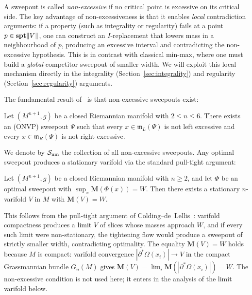 A sweepout is called \emph{non-excessive} if no critical point is excessive on its critical side. The key advantage of non-excessiveness is that it enables \emph{local} contradiction arguments: if a property (such as integrality or regularity) fails at a point $p \in \mathbf{spt}\|V\|$, one can construct an $I$-replacement that lowers mass in a neighbourhood of $p$, producing an excessive interval and contradicting the non-excessive hypothesis. This is in contrast with classical min-max, where one must build a \emph{global} competitor sweepout of smaller width. We will exploit this local mechanism directly in the integrality (Section~\ref{sec:integrality}) and regularity (Section~\ref{sec:regularity}) arguments.

The fundamental result of~\cite{CLS22} is that non-excessive sweepouts exist:

\begin{theorem}\label{thm:non-excessive-existence}
Let $(M^{n+1},g)$ be a closed Riemannian manifold with $2\leq n\leq 6$. There exists an (ONVP) sweepout $\Psi$ such that every $x\in \mathfrak{m}_L(\Psi)$ is not left excessive and every $x \in \mathfrak{m}_R(\Psi)$ is not right excessive.
\end{theorem}

We denote by $\mathcal{S}_{\mathrm{nm}}$ the collection of all non-excessive sweepouts. Any optimal sweepout produces a stationary varifold via the standard pull-tight argument:

\begin{proposition}\label{thm:CLS-stationary}
Let $(M^{n+1},g)$ be a closed Riemannian manifold with $n \geq 2$, and let $\Phi$ be an optimal sweepout with $\sup_x \mathbf{M}(\Phi(x)) = W$. Then there exists a stationary $n$-varifold $V$ in $M$ with $\mathbf{M}(V) = W$.
\end{proposition}

This follows from the pull-tight argument of Colding--de~Lellis~\cite{CL03}: varifold compactness produces a limit $V$ of slices whose masses approach $W$, and if every such limit were non-stationary, the tightening flow would produce a sweepout of strictly smaller width, contradicting optimality. The equality $\mathbf{M}(V) = W$ holds because $M$ is compact: varifold convergence $|\partial^*\Omega(x_i)| \to V$ in the compact Grassmannian bundle $G_n(M)$ gives $\mathbf{M}(V) = \lim_i \mathbf{M}(|\partial^*\Omega(x_i)|) = W$. The non-excessive condition is not used here; it enters in the analysis of the limit varifold below.


